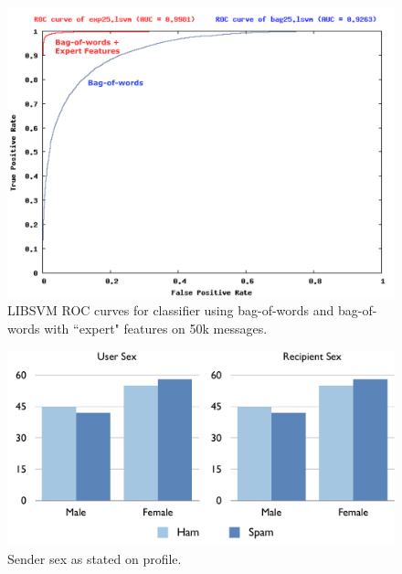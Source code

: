 \documentclass[preprint]{acm_proc_article-sp}
\begin{document}
\begin{figure}[h]
    \centering
    \includegraphics[width=\linewidth]{figures/roc-25.pdf}
    \caption{LIBSVM ROC curves for classifier using bag-of-words and bag-of-words with ``expert" features on 50k messages.}
    \label{fig:roc-25}
\end{figure}


\begin{figure}[h]
    \centering
    \includegraphics[width=\linewidth]{figures/sex.pdf}
    \caption{Sender sex as stated on profile.}
    \label{fig:sendsex}
\end{figure}





\balancecolumns
\end{document}
